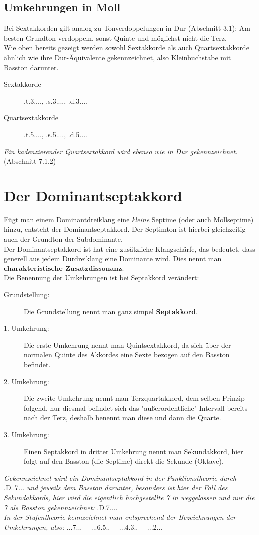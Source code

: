 \documentclass[a4paper]{article}
\newcommand{\dShoch}[4]{\HH.\uppercase\expandafter{\romannumeral #1\relax}..#2.#3.#4.} %
\newcommand{\Dhoch}[2]{\HH.D.#2.#1...}
\newcommand{\TSm}{\HH.t.3....}
\newcommand{\TQSm}{\HH.t.5....}
\newcommand{\SSm}{\HH.s.3....}
\newcommand{\SQSm}{\HH.s.5....}
\newcommand{\DSem}{\HH.d.3....}
\newcommand{\DQSm}{\HH.d.5....}
\begin{document}
	\subsection{Umkehrungen in Moll}
	Bei Sextakkorden gilt analog zu Tonverdoppelungen in Dur (Abschnitt 3.1): Am besten Grundton verdoppeln, sonst Quinte und möglichst nicht die Terz.\\
	Wie oben bereits gezeigt werden sowohl Sextakkorde als auch Quartsextakkorde ähnlich wie ihre Dur-Äquivalente gekennzeichnet, also Kleinbuchstabe mit Basston darunter.
	\begin{description}
		\item[Sextakkorde] \TSm, \SSm, \DSem
		\item[Quartsextakkorde] \TQSm, \SQSm, \DQSm
	\end{description}
	\textit{Ein kadenzierender Quartsextakkord wird ebenso wie in Dur gekennzeichnet.} (Abschnitt 7.1.2)
	
	\section{Der Dominantseptakkord}
	Fügt man einem Dominantdreiklang eine \textit{kleine} Septime (oder auch Mollseptime) hinzu, entsteht der Dominantseptakkord. Der Septimton ist hierbei gleichzeitig auch der Grundton der Subdominante.\\
	Der Dominantseptakkord ist hat eine zusätzliche Klangschärfe, das bedeutet, dass generell aus jedem Durdreiklang eine Dominante wird. Dies nennt man \textbf{charakteristische Zusatzdissonanz}.\\
	Die Benennung der Umkehrungen ist bei Septakkord verändert:
	\begin{description}
		\item[Grundstellung:] Die Grundstellung nennt man ganz simpel \textbf{Septakkord}.
		\item[1. Umkehrung:] Die erste Umkehrung nennt man Quintsextakkord, da sich über der normalen Quinte des Akkordes eine Sexte bezogen auf den Basston befindet.
		\item[2. Umkehrung:] Die zweite Umkehrung nennt man Terzquartakkord, dem selben Prinzip folgend, nur diesmal befindet sich das "{}außerordentliche" Intervall bereits nach der Terz, deshalb benennt man diese und dann die Quarte.
		\item[3. Umkehrung:] Einen Septakkord in dritter Umkehrung nennt man Sekundakkord, hier folgt auf den Basston (die Septime) direkt die Sekunde (Oktave).
	\end{description}
	\textit{Gekennzeichnet wird ein Dominantseptakkord in der Funktionstheorie durch} \Dhoch{7}{} \textit{und jeweils dem Basston darunter, besonders ist hier der Fall des Sekundakkords, hier wird die eigentlich hochgestellte 7 in weggelassen und nur die 7 als Basston gekennzeichnet:} \Dhoch{}{7} \\
	\textit{In der Stufentheorie kennzeichnet man entsprechend der Bezeichnungen der Umkehrungen, also:} \dShoch{5}{7}{}{}\ -\ \dShoch{5}{6}{5}{}\ -\ \dShoch{5}{4}{3}{}\ -\ \dShoch{5}{2}{}{}
	
\end{document}
